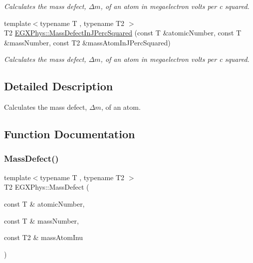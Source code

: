 \begin{DoxyCompactItemize}
\begin{DoxyCompactList}\small\item\em Calculates the mass defect, $\Delta m$, of an atom in megaelectron volts per c squared. \end{DoxyCompactList}\item 
{\footnotesize template$<$typename T , typename T2 $>$ }\\T2 \mbox{\hyperlink{group___e_g_x_phys-_mass_defect_ga08cff1dfa3259af8f1b67ec741796e91}{E\+G\+X\+Phys\+::\+Mass\+Defect\+In\+J\+Perc\+Squared}} (const T \&atomic\+Number, const T \&mass\+Number, const T2 \&mass\+Atom\+In\+J\+Perc\+Squared)
\begin{DoxyCompactList}\small\item\em Calculates the mass defect, $\Delta m$, of an atom in megaelectron volts per c squared. \end{DoxyCompactList}\end{DoxyCompactItemize}


\subsection{Detailed Description}
Calculates the mass defect, $\Delta m$, of an atom. 

\subsection{Function Documentation}
\mbox{\label{group___e_g_x_phys-_mass_defect_gae89f2dfa65992c0314adc2440b2f582a}} 
\subsubsection{\texorpdfstring{Mass\+Defect()}{MassDefect()}}
{\footnotesize\ttfamily template$<$typename T , typename T2 $>$ \\
T2 E\+G\+X\+Phys\+::\+Mass\+Defect (\begin{DoxyParamCaption}\item[{const T \&}]{atomic\+Number,  }\item[{const T \&}]{mass\+Number,  }\item[{const T2 \&}]{mass\+Atom\+Inu }\end{DoxyParamCaption})}



